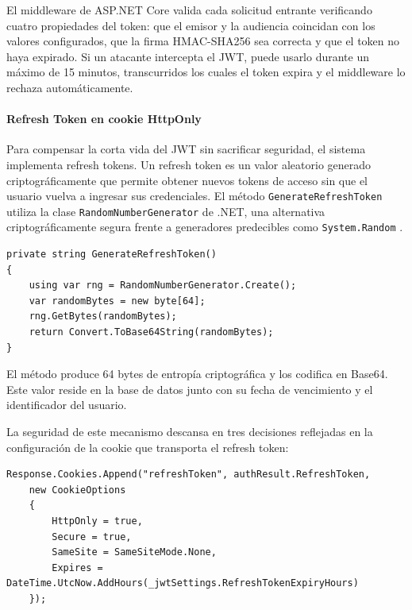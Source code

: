 El middleware de ASP.NET Core valida cada solicitud entrante verificando cuatro propiedades del token: que el emisor y la audiencia coincidan con los valores configurados, que la firma HMAC-SHA256 sea correcta y que el token no haya expirado. Si un atacante intercepta el JWT, puede usarlo durante un máximo de 15 minutos, transcurridos los cuales el token expira y el middleware lo rechaza automáticamente.

\paragraph{Refresh Token en cookie HttpOnly}

Para compensar la corta vida del JWT sin sacrificar seguridad, el sistema implementa refresh tokens. Un refresh token es un valor aleatorio generado criptográficamente que permite obtener nuevos tokens de acceso sin que el usuario vuelva a ingresar sus credenciales. El método \texttt{GenerateRefreshToken} utiliza la clase \texttt{RandomNumberGenerator} de .NET, una alternativa criptográficamente segura frente a generadores predecibles como \texttt{System.Random} \cite{microsoft_random}.

\begin{lstlisting}[language={[Sharp]C}, caption={Generación criptográfica del refresh token}, label={lst:generaterefreshtoken}]
private string GenerateRefreshToken()
{
    using var rng = RandomNumberGenerator.Create();
    var randomBytes = new byte[64];
    rng.GetBytes(randomBytes);
    return Convert.ToBase64String(randomBytes);
}
\end{lstlisting}

El método produce 64 bytes de entropía criptográfica y los codifica en Base64. 
Este valor reside en la base de datos junto con su fecha de vencimiento y el identificador del usuario.

La seguridad de este mecanismo descansa en tres decisiones reflejadas en la configuración de la cookie que transporta el refresh token:

\begin{lstlisting}[language={[Sharp]C}, caption={Configuración de la cookie del refresh token}, label={lst:cookieconfig}]
Response.Cookies.Append("refreshToken", authResult.RefreshToken,
    new CookieOptions
    {
        HttpOnly = true,
        Secure = true,
        SameSite = SameSiteMode.None,
        Expires = DateTime.UtcNow.AddHours(_jwtSettings.RefreshTokenExpiryHours)
    });
\end{lstlisting}

